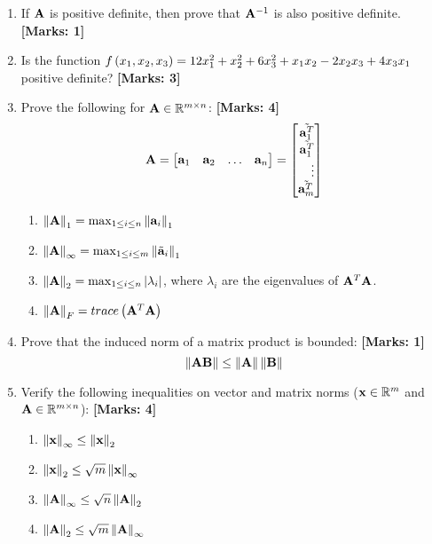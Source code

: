 \documentclass[12pt]{article}
\def\mf{\ensuremath\mathbf}
\def\mb{\ensuremath\mathbb}
\def\lp{\ensuremath\left(}
\def\rp{\ensuremath\right)}
\def\lv{\ensuremath\left\lvert}
\def\rv{\ensuremath\right\rvert}
\def\lV{\ensuremath\left\lVert}
\def\rV{\ensuremath\right\rVert}
\def\bmx{\ensuremath\begin{bmatrix*}[r]}
\def\emx{\ensuremath\end{bmatrix*}}
\begin{document}
\begin{enumerate}
    \item If $\mf{A}$ is positive definite, then prove that $\mf{A}^{-1}$ is also positive definite. \textbf{[Marks: 1]}

    \item Is the function $f\lp x_1, x_2, x_3\rp = 12 x_1^2 + x_2^2 + 6x_3^2 + x_1x_2 - 2x_2x_3 + 4x_3x_1$ positive definite?  \textbf{[Marks: 3]}
    
    \item Prove the following for $\mf{A} \in \mb{R}^{m \times n}$:  \textbf{[Marks: 4]}
    \[ \mf{A} = \bmx \mf{a}_1 & \mf{a}_2 & \ldots & \mf{a}_n\emx = \bmx \tilde{\mf{a}_1^T}\\ \tilde{\mf{a}_1^T} \\ \vdots \\ \tilde{\mf{a}_m^T}\emx \]
    \begin{enumerate}
        \item $\lV\mf{A}\rV_1 = \max_{1 \leq i \leq n} \lV\mf{a}_i\rV_1$
        \item $\lV\mf{A}\rV_\infty = \max_{1 \leq i \leq m} \lV\tilde{\mf{a}}_i\rV_1$
        \item $\lV\mf{A}\rV_2 = \max_{1 \leq i \leq n} \lv \lambda_i \rv$, where $\lambda_i$ are the eigenvalues of $\mf{A}^T\mf{A}$.
        \item $\lV\mf{A}\rV_F = trace\lp \mf{A}^T\mf{A}\rp$
    \end{enumerate}

    \item Prove that the induced norm of a matrix product is bounded:  \textbf{[Marks: 1]}
    \[ \lV\mf{A}\mf{B}\rV \leq \lV\mf{A}\rV\lV\mf{B}\rV \]

    \item Verify the following inequalities on vector and matrix norms ($\mf{x} \in \mb{R}^m$ and $\mf{A} \in \mb{R}^{m \times n}$):  \textbf{[Marks: 4]}
    \begin{enumerate}
        \item $\lV\mf{x}\rV_\infty \leq \lV\mf{x}\rV_2$
        \item $\lV\mf{x}\rV_2 \leq \sqrt{m}\lV\mf{x}\rV_\infty$
        \item $\lV\mf{A}\rV_\infty \leq \sqrt{n}\lV\mf{A}\rV_2$
        \item $\lV\mf{A}\rV_2 \leq \sqrt{m}\lV\mf{A}\rV_\infty$
    \end{enumerate}

\end{enumerate}
\end{document}
